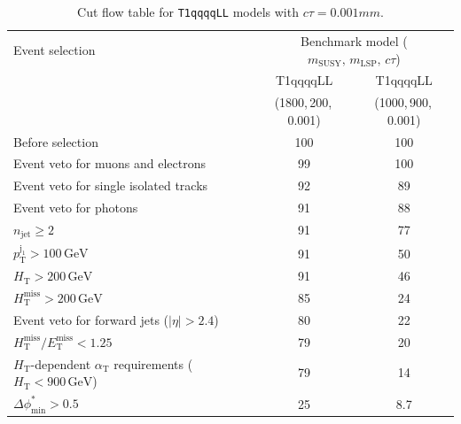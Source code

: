 \clearpage
\begin{table}[!h]
  \caption{Cut flow table for \texttt{T1qqqqLL} models with $c\tau = 0.001\unit{mm}$.} 
  \label{tab:cut_flow_ctau_0p001}
{\scriptsize%
\centering
\begin{tabular}{lcc}
  \hline
  Event selection & \multicolumn{2}{c}{Benchmark model ($m_\mathrm{SUSY},\,m_\mathrm{LSP},\,c\tau$)} \\
  \cline{2-3}
   & T1qqqqLL & T1qqqqLL \\
   & (1800,\,200,\,0.001) & (1000,\,900,\,0.001) \\
  \hline
  Before selection & 100\phantom{.1} & 100\phantom{.1} \\
  Event veto for muons and electrons & \phantom{1}99\phantom{.1} & 100\phantom{.1} \\
  Event veto for single isolated tracks & \phantom{1}92\phantom{.1} & \phantom{1}89\phantom{.1}  \\
  Event veto for photons & \phantom{1}91\phantom{.1} & \phantom{1}88\phantom{.1} \\
   $n_{\mathrm{jet}} \geq 2$ & \phantom{1}91\phantom{.1} & \phantom{1}77\phantom{.1}  \\
   $p_{\mathrm{T}}^{\mathrm{j_1}} > 100\,\mathrm{GeV}$ & \phantom{1}91\phantom{.1} & \phantom{1}50\phantom{.1} \\
   $H_{\mathrm{T}} > 200\,\mathrm{GeV}$ & \phantom{1}91\phantom{.1} & \phantom{1}46\phantom{.1}  \\
  $H_{\mathrm{T}}^{\mathrm{miss}} > 200\,\mathrm{GeV}$ & \phantom{1}85\phantom{.1} & \phantom{1}24\phantom{.1}  \\
  Event veto for forward jets ($|\eta| > 2.4$) & \phantom{1}80\phantom{.1} & \phantom{1}22\phantom{.1}  \\
  $H_{\mathrm{T}}^{\mathrm{miss}} / E_{\mathrm{T}}^{\mathrm{miss}} < 1.25$ & \phantom{1}79\phantom{.1} & \phantom{1}20\phantom{.1}  \\
  $H_{\mathrm{T}}$-dependent $\alpha_{\mathrm{T}}$ requirements ($H_{\mathrm{T}} < 900\,\mathrm{GeV}$) & \phantom{1}79\phantom{.1} & \phantom{1}14\phantom{.1} \\
  $\Delta\phi^{*}_{\mathrm{min}} > 0.5$ & \phantom{1}25\phantom{.1} & \phantom{10}8.7  \\
  \hline
\end{tabular}
}
\end{table}

